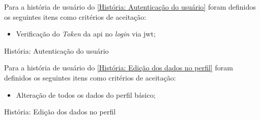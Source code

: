 Para a história de usuário do \autoref{História: Autenticação do usuário} foram definidos os seguintes itens como critérios de aceitação:

\begin{itemize}
\item Verificação do \textsl{Token} da \acs{api} no \textsl{login} via \acs{jwt};
\end{itemize}

\def\arraystretch{2}
\begin{quadro}[htb]
\centering
\ABNTEXfontereduzida
\caption[História: Autenticação do usuário]{História: Autenticação do usuário}
\label{História: Autenticação do usuário}
\end{quadro}
\FloatBarrier 

Para a história de usuário do \autoref{História: Edição dos dados no perfil} foram definidos os seguintes itens como critérios de aceitação:

\begin{itemize}
\item Alteração de todos os dados do perfil básico; 
\end{itemize}

\def\arraystretch{2}
\begin{quadro}[htb]
\centering
\ABNTEXfontereduzida
\caption[História: Edição dos dados no perfil]{História: Edição dos dados no perfil}
\label{História: Edição dos dados no perfil}
\end{quadro}
\FloatBarrier 

